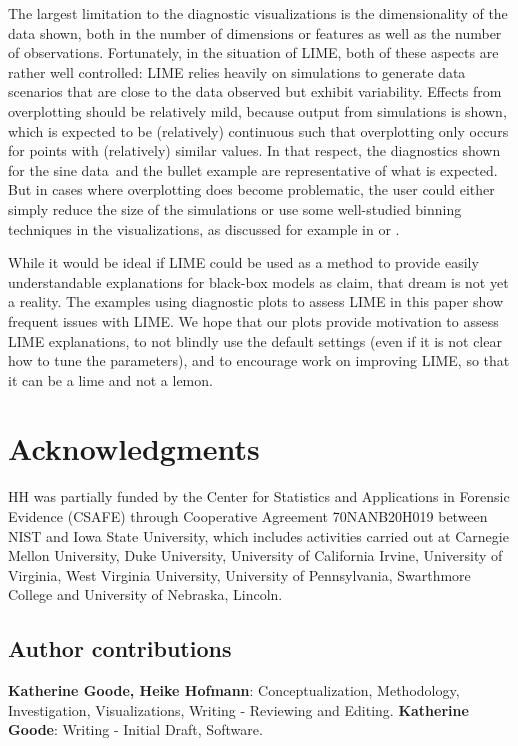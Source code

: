 \documentclass[AMS,STIX2COL]{WileyNJD-v2}\usepackage[]{graphicx}\usepackage[]{color}
\newcommand{\data}{sine data}
\begin{document}
The largest limitation to the diagnostic visualizations is the dimensionality of the data shown, both in the number of dimensions or features as well as the number of observations. Fortunately, in the situation of LIME, both of these aspects are rather well controlled: LIME relies heavily on simulations to generate data scenarios that are close to the data observed but exhibit variability. Effects from overplotting should be relatively mild, because output from simulations is shown, which is expected to be (relatively) continuous such that overplotting only occurs for points with (relatively) similar values. In that respect, the diagnostics shown for the \data \ and the bullet example are representative of what is expected. But in cases where overplotting does become problematic, the user could either simply reduce the size of the simulations or use some well-studied binning techniques in the visualizations, as discussed for example in \citet{carr:1987} or \citet{unwin:2006}. 

While it would be ideal if LIME could be used as a method to provide easily understandable explanations for black-box models as \citet{ribeiro:2016} claim, that dream is not yet a reality. The examples using diagnostic plots to assess LIME in this paper show frequent issues with LIME. We hope that our plots provide motivation to assess LIME explanations, to not blindly use the default settings (even if it is not clear how to tune the parameters), and to encourage work on improving LIME, so that it can be a lime and not a lemon.

\section*{Acknowledgments}

HH was partially funded by the Center for Statistics and Applications in Forensic Evidence (CSAFE) through Cooperative Agreement 70NANB20H019 between NIST and Iowa State University, which includes activities carried out at Carnegie Mellon University, Duke University, University of California Irvine, University of Virginia, West Virginia University, University of Pennsylvania, Swarthmore College and University of Nebraska, Lincoln.

\subsection*{Author contributions}

{\bf Katherine Goode, Heike Hofmann}: Conceptualization, Methodology, Investigation, Visualizations, Writing - Reviewing and Editing. {\bf Katherine Goode}: Writing - Initial Draft, Software.
\end{document}
